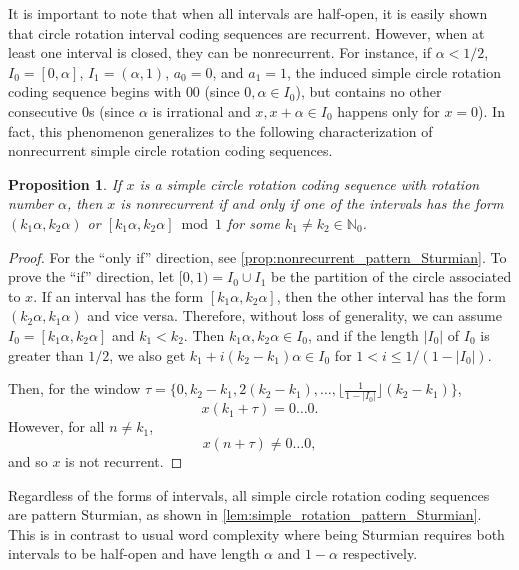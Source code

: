 \documentclass[11pt,reqno]{amsart}
\newtheorem{proposition}[theorem]{Proposition}
\theoremstyle{definition}
\theoremstyle{plain}
\newcommand{\N}{\mathbb{N}}
\newcommand{\AuthornoteA}[2]{{\sf\small\color{magenta}{[#1: #2]}}}
\newcommand{\Anote}{\AuthornoteA{A}}
\begin{document}
It is important to note that when all intervals are half-open, it is easily shown that circle rotation interval coding sequences are recurrent. However, when at least one interval is closed, they can be nonrecurrent. For instance, if $\alpha < 1/2$, $I_0 = [0,\alpha]$, $I_1 = (\alpha, 1)$, $a_0 = 0$, and $a_1 = 1$, the induced simple circle rotation coding sequence begins with $00$ (since $0, \alpha \in I_0$), but contains no other consecutive $0$s (since $\alpha$ is irrational and $x, x+\alpha \in I_0$ happens only for $x = 0$). In fact, this phenomenon generalizes to the following characterization of nonrecurrent simple circle rotation coding sequences. 

\begin{proposition}
If $x$ is a simple circle rotation coding sequence with rotation number $\alpha$, then $x$ is nonrecurrent if and only if one of the intervals has the form $(k_1 \alpha, k_2 \alpha)$ or $[k_1 \alpha, k_2 \alpha] \bmod 1$ for some $k_1 \neq k_2 \in \N_0$.
\end{proposition}
\begin{proof}
For the ``only if'' direction, see \cref{prop:nonrecurrent_pattern_Sturmian}. To prove the ``if'' direction, let $[0, 1) = I_0 \cup I_1$ be the partition of the circle associated to $x$. If an interval has the form $[k_1 \alpha, k_2 \alpha]$, then the other interval has the form $(k_2 \alpha, k_1 \alpha)$ and vice versa. Therefore, without loss of generality, we can assume $I_0 = [k_1 \alpha, k_2 \alpha]$ and $k_1 < k_2$. Then $k_1 \alpha, k_2 \alpha \in I_0$, and if the length $|I_0|$ of $I_0$ is greater than $1/2$, we also get $k_1 + i(k_2 - k_1)\alpha \in I_0$ for $1 < i \leq 1/(1 - |I_0|)$.
% 

Then, for the window $\tau = \{0, k_2 - k_1, 2(k_2 - k_1), \ldots, \lfloor \frac{1}{1 - |I_0|} \rfloor (k_2 - k_1)\}$, 
\[
    x(k_1 + \tau) = 0 \ldots 0.
\]
However, for all $n \neq k_1$, 
\[
    x(n + \tau) \neq 0 \ldots 0,
\]
and so $x$ is not recurrent.
\end{proof}

Regardless of the forms of intervals, all simple circle rotation coding sequences are pattern Sturmian, as shown in \cref{lem:simple_rotation_pattern_Sturmian}. This is in contrast to usual word complexity where being Sturmian requires both intervals to be half-open and have length $\alpha$ and $1 - \alpha$ respectively. %
\end{document}
